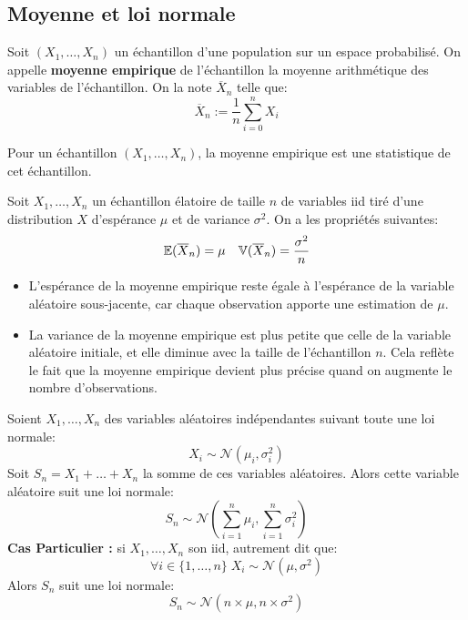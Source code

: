 \subsection{Moyenne et loi normale}

\begin{definition}
    Soit  $(X_1, \dots, X_n)$ un échantillon d'une population sur un espace probabilisé. 
    On appelle \textbf{moyenne empirique} de l'échantillon la moyenne arithmétique des variables de l'échantillon. 
    On la note $\overline{X}_n$ telle que: 
        \[ \overline{X}_n := \frac{1}{n} \sum_{i=0}^{n} X_i \]
\end{definition}

\begin{example}
    Pour un échantillon $(X_1, \dots, X_n)$, la moyenne empirique est une statistique de cet échantillon. 
\end{example}

\begin{proposition}
    Soit $X_1, \dots, X_n$ un échantillon élatoire de taille $n$ de variables iid tiré 
    d'une distribution $X$ d'espérance $\mu$ et de variance $\sigma^2$. On a les propriétés suivantes: 
        \[ \mathbb{E}(\overline{X}_n) = \mu \quad \mathbb{V}(\overline{X}_n) = \frac{\sigma^2}{n} \]  
\end{proposition}

\begin{itemize}
    \item L'espérance de la moyenne empirique reste égale à 
    l'espérance de la variable aléatoire sous-jacente, car chaque observation apporte une estimation de $\mu$.
    \item La variance de la moyenne empirique est plus petite que celle de la variable aléatoire initiale, 
    et elle diminue avec la taille de l'échantillon $n$. 
    Cela reflète le fait que la moyenne empirique devient plus précise quand on augmente le nombre d'observations. 
\end{itemize}

\newpage 

\begin{theorem}
    Soient $X_1, \dots, X_n$ des variables aléatoires indépendantes suivant toute une loi normale: 
        \[ X_i \sim \mathcal{N}(\mu_i, \sigma_i^2) \] 
    Soit $S_n = X_1 + \dots + X_n$ la somme de ces variables aléatoires. Alors cette variable aléatoire suit 
    une loi normale: 
        \[ S_n \sim \mathcal{N}(\sum_{i=1}^{n} \mu_i, \sum_{i=1}^{n} \sigma_i^2) \] 
    \textbf{Cas Particulier :} si $X_1, \dots, X_n$ son iid, autrement dit que: 
        \[ \forall i \in \{1, \dots, n\} \; X_i \sim \mathcal{N}(\mu, \sigma^2) \] 
    Alors $S_n$ suit une loi normale: 
        \[ S_n \sim \mathcal{N}(n \times \mu, n \times \sigma^2) \]
\end{theorem}

